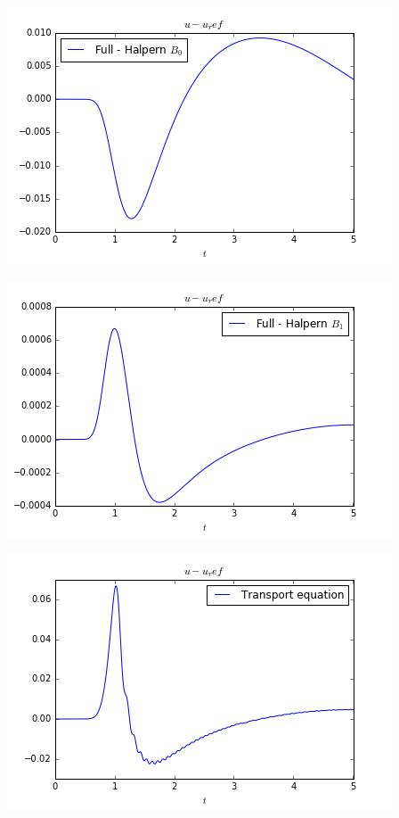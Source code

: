 \noindent\begin{minipage}{\textwidth} 
	\begin{minipage}{.5\textwidth} 
		\includegraphics[scale=.48]{figures/errFullB0.png}	
	\end{minipage}
	\begin{minipage}{.5\textwidth} 
		\includegraphics[scale=.48]{figures/errFullB1.png}	
	\end{minipage}
	\begin{minipage}{.5\textwidth} 
		\includegraphics[scale=.48]{figures/errTransport.png}	

\end{minipage}
\end{minipage}
